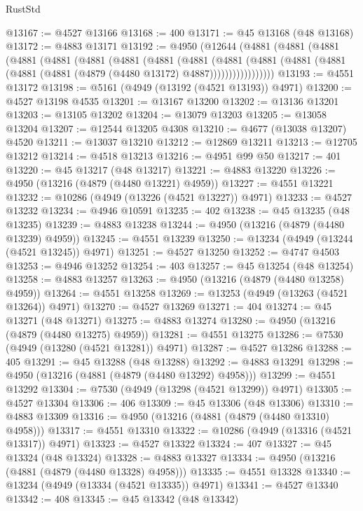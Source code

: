 \begin{lexlean}{RustStd}
\begin{coremodule}
@13167 := @4527 @13166
@13168 := 400
@13171 := @45 @13168 (@48 @13168)
@13172 := @4883 @13171
@13192 := @4950
    (@12644
      (@4881
        (@4881
          (@4881
            (@4881
              (@4881
                (@4881
                  (@4881
                    (@4881
                      (@4881
                        (@4881
                          (@4881
                            (@4881 (@4881 (@4881 (@4881 (@4879 (@4480 @13172) @4887)))))))))))))))))
@13193 := @4551 @13172
@13198 := @5161 (@4949 (@13192 (@4521 @13193)) @4971)
@13200 := @4527 @13198 @4535
@13201 := @13167 @13200
@13202 := @13136 @13201
@13203 := @13105 @13202
@13204 := @13079 @13203
@13205 := @13058 @13204
@13207 := @12544 @13205 @4308
@13210 := @4677 (@13038 @13207) @4520
@13211 := @13037 @13210
@13212 := @12869 @13211
@13213 := @12705 @13212
@13214 := @4518 @13213
@13216 := @4951 @99 @50
@13217 := 401
@13220 := @45 @13217 (@48 @13217)
@13221 := @4883 @13220
@13226 := @4950 (@13216 (@4879 (@4480 @13221) @4959))
@13227 := @4551 @13221
@13232 := @10286 (@4949 (@13226 (@4521 @13227)) @4971)
@13233 := @4527 @13232
@13234 := @4946 @10591
@13235 := 402
@13238 := @45 @13235 (@48 @13235)
@13239 := @4883 @13238
@13244 := @4950 (@13216 (@4879 (@4480 @13239) @4959))
@13245 := @4551 @13239
@13250 := @13234 (@4949 (@13244 (@4521 @13245)) @4971)
@13251 := @4527 @13250
@13252 := @4747 @4503
@13253 := @4946 @13252
@13254 := 403
@13257 := @45 @13254 (@48 @13254)
@13258 := @4883 @13257
@13263 := @4950 (@13216 (@4879 (@4480 @13258) @4959))
@13264 := @4551 @13258
@13269 := @13253 (@4949 (@13263 (@4521 @13264)) @4971)
@13270 := @4527 @13269
@13271 := 404
@13274 := @45 @13271 (@48 @13271)
@13275 := @4883 @13274
@13280 := @4950 (@13216 (@4879 (@4480 @13275) @4959))
@13281 := @4551 @13275
@13286 := @7530 (@4949 (@13280 (@4521 @13281)) @4971)
@13287 := @4527 @13286
@13288 := 405
@13291 := @45 @13288 (@48 @13288)
@13292 := @4883 @13291
@13298 := @4950 (@13216 (@4881 (@4879 (@4480 @13292) @4958)))
@13299 := @4551 @13292
@13304 := @7530 (@4949 (@13298 (@4521 @13299)) @4971)
@13305 := @4527 @13304
@13306 := 406
@13309 := @45 @13306 (@48 @13306)
@13310 := @4883 @13309
@13316 := @4950 (@13216 (@4881 (@4879 (@4480 @13310) @4958)))
@13317 := @4551 @13310
@13322 := @10286 (@4949 (@13316 (@4521 @13317)) @4971)
@13323 := @4527 @13322
@13324 := 407
@13327 := @45 @13324 (@48 @13324)
@13328 := @4883 @13327
@13334 := @4950 (@13216 (@4881 (@4879 (@4480 @13328) @4958)))
@13335 := @4551 @13328
@13340 := @13234 (@4949 (@13334 (@4521 @13335)) @4971)
@13341 := @4527 @13340
@13342 := 408
@13345 := @45 @13342 (@48 @13342)

\end{coremodule}
\end{lexlean}
